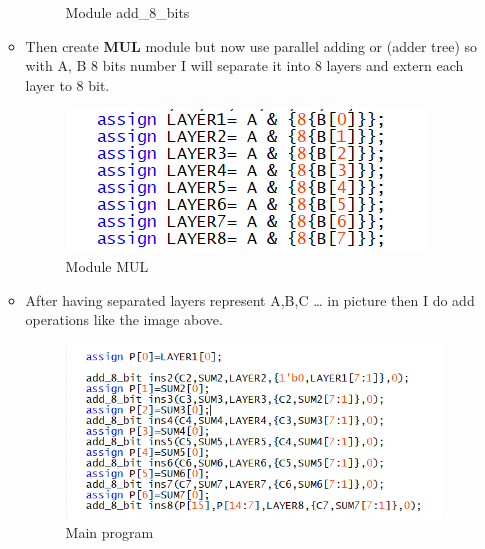 \begin{itemize}
\begin{itemize}
\begin{figure}[h]
                    \caption{Module add\_8\_bits}
                \end{figure}
            \item []Then create \textbf{MUL} module but now use parallel adding or (adder tree) so with A, B 8 bits number I will separate it into 8 layers and extern each layer to 8 bit.
                \begin{figure}[h]
                    \centering
                    \includegraphics[width=\textwidth]{source/picture/Lab6/Lab6_mul.png}
                    \caption{Module MUL}
                \end{figure}
            \item []After having separated layers represent A,B,C … in picture then I do add operations like the image above.
                \begin{figure}[h]
                    \centering
                    \includegraphics[width=\textwidth]{source/picture/Lab6/Lab6_rest.png}
                    \caption{Main program}

                \end{figure}
        \end{itemize}   
\end{itemize}
\clearpage
